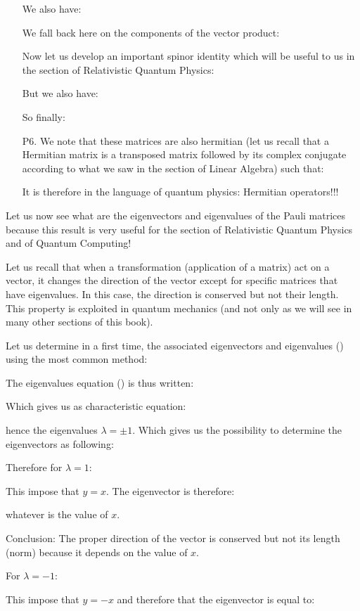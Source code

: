 \begin{enumerate}
		We also have:
		
		We fall back here on the components of the vector product:
		
		Now let us develop an important spinor identity which will be useful to us in the section of Relativistic Quantum Physics:
		
		But we also have:
		
		So finally:	
		
	
		\item[P6.] We note that these matrices are also hermitian (let us recall that a Hermitian matrix is a transposed matrix followed by its complex conjugate according to what we saw in the section of Linear Algebra) such that:
		
		It is therefore in the language of quantum physics: Hermitian operators!!!
	\end{enumerate}
	Let us now see what are the eigenvectors and eigenvalues of the Pauli matrices because this result is very useful for the section of Relativistic Quantum Physics and of Quantum Computing!

	Let us recall that when a transformation (application of a matrix) act on a vector, it changes the direction of the vector except for specific matrices that have eigenvalues. In this case, the direction is conserved but not their length. This property is exploited in quantum mechanics (and not only as we will see in many other sections of this book).
	
	Let us determine in a first time, the associated eigenvectors and eigenvalues () using the most common method:
	
	The eigenvalues equation () is thus written:
	
	Which gives us as characteristic equation:
	
	hence the eigenvalues $\lambda=\pm 1$. Which gives us the possibility to determine the eigenvectors as following:
	
	Therefore for $\lambda=1$:
	
	This impose that $y=x$. The eigenvector is therefore:
	
	whatever is the value of $x$.
	
	Conclusion: The proper direction of the vector is conserved but not its length (norm) because it depends on the value of $x$.
	
	For $\lambda=-1$:
	
	This impose that $y=-x$ and therefore that the eigenvector is  equal to:
	
